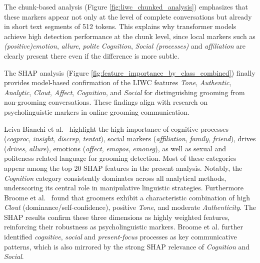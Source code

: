 The chunk-based analysis (Figure \ref{fig:liwc_chunked_analysis}) emphasizes that these markers appear not only at the level of complete conversations but already in short text segments of 512 tokens. This explains why transformer models achieve high detection performance at the chunk level, since local markers such as \textit{(positive)emotion}, \textit{allure}, \textit{polite} \textit{Cognition}, \textit{Social (processes)} and \textit{affiliation} are clearly present there even if the difference is more subtle.

The SHAP analysis (Figure \ref{fig:feature_importance_by_class_combined}) finally provides model-based confirmation of the LIWC features \textit{Tone}, \textit{Authentic}, \textit{Analytic}, \textit{Clout}, \textit{Affect}, \textit{Cognition}, and \textit{Social} for distinguishing grooming from non-grooming conversations. These findings align with research on psycholinguistic markers in online grooming communication. 

Leiva-Bianchi et al.~\cite{leiva2024meta} highlight the high importance of cognitive processes (\textit{cogproc}, \textit{insight}, \textit{discrep}, \textit{tentat}), social markers (\textit{affiliation}, \textit{family}, \textit{friend}), drives (\textit{drives}, \textit{allure}), emotions (\textit{affect}, \textit{emopos}, \textit{emoneg}), as well as sexual and politeness related language for grooming detection. Most of these categories appear among the top 20 SHAP features in the present analysis. Notably, the \textit{Cognition} category consistently dominates across all analytical methods, underscoring its central role in manipulative linguistic strategies. Furthermore Broome et al.~\cite{broome2020psycholinguistic} found that groomers exhibit a characteristic combination of high \textit{Clout} (dominance/self-confidence), positive \textit{Tone}, and moderate \textit{Authenticity}. The SHAP results confirm these three dimensions as highly weighted features, reinforcing their robustness as psycholinguistic markers. Broome et al. further identified \textit{cognitive}, \textit{social} and \textit{present-focus} processes as key communicative patterns, which is also mirrored by the strong SHAP relevance of \textit{Cognition} and \textit{Social}.


